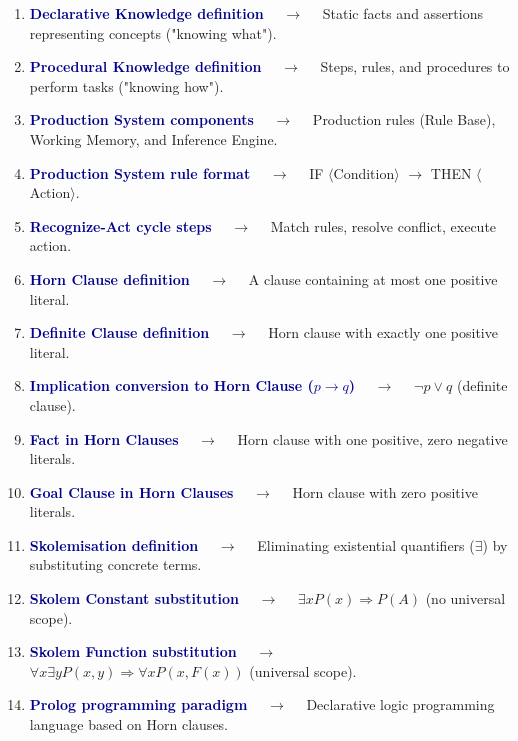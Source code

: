 \documentclass[11pt,a4paper]{article}
\begin{document}
\begin{enumerate}[label=\arabic*., leftmargin=*, labelsep=0.8em, itemsep=0.35em, parsep=0.1em, topsep=0.2em]
  \item \textcolor{darkblue}{\textbf{Declarative Knowledge definition}} $\quad\to\quad$ Static facts and assertions representing concepts ("knowing what").
  \item \textcolor{darkblue}{\textbf{Procedural Knowledge definition}} $\quad\to\quad$ Steps, rules, and procedures to perform tasks ("knowing how").
  \item \textcolor{darkblue}{\textbf{Production System components}} $\quad\to\quad$ Production rules (Rule Base), Working Memory, and Inference Engine.
  \item \textcolor{darkblue}{\textbf{Production System rule format}} $\quad\to\quad$ IF $\langle$Condition$\rangle$ $\rightarrow$ THEN $\langle$Action$\rangle$.
  \item \textcolor{darkblue}{\textbf{Recognize-Act cycle steps}} $\quad\to\quad$ Match rules, resolve conflict, execute action.
  \item \textcolor{darkblue}{\textbf{Horn Clause definition}} $\quad\to\quad$ A clause containing at most one positive literal.
  \item \textcolor{darkblue}{\textbf{Definite Clause definition}} $\quad\to\quad$ Horn clause with exactly one positive literal.
  \item \textcolor{darkblue}{\textbf{Implication conversion to Horn Clause ($p \rightarrow q$)}} $\quad\to\quad$ $\neg p \lor q$ (definite clause).
  \item \textcolor{darkblue}{\textbf{Fact in Horn Clauses}} $\quad\to\quad$ Horn clause with one positive, zero negative literals.
  \item \textcolor{darkblue}{\textbf{Goal Clause in Horn Clauses}} $\quad\to\quad$ Horn clause with zero positive literals.
  \item \textcolor{darkblue}{\textbf{Skolemisation definition}} $\quad\to\quad$ Eliminating existential quantifiers ($\exists$) by substituting concrete terms.
  \item \textcolor{darkblue}{\textbf{Skolem Constant substitution}} $\quad\to\quad$ $\exists x P(x) \Longrightarrow P(A)$ (no universal scope).
  \item \textcolor{darkblue}{\textbf{Skolem Function substitution}} $\quad\to\quad$ $\forall x\exists y P(x,y)\Longrightarrow\forall x P(x,F(x))$ (universal scope).
  \item \textcolor{darkblue}{\textbf{Prolog programming paradigm}} $\quad\to\quad$ Declarative logic programming language based on Horn clauses.

\end{enumerate}
\end{document}

